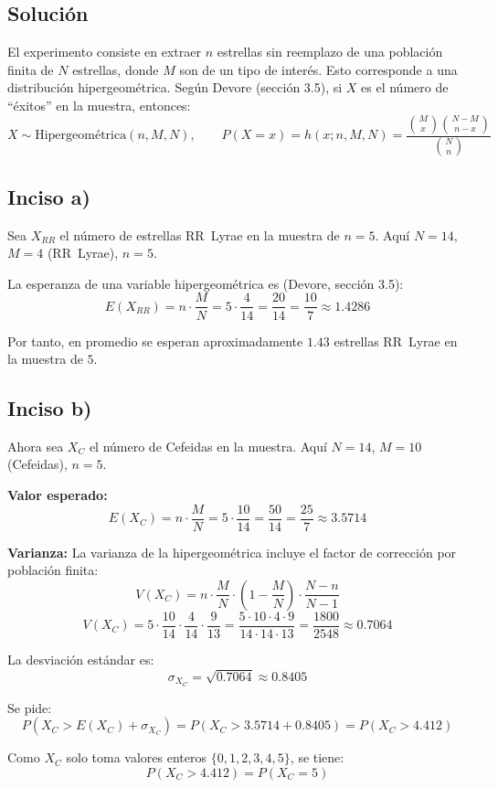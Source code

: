 \documentclass[12pt]{article}
\begin{document}
\subsection{Solución}

El experimento consiste en extraer $n$ estrellas sin reemplazo de una población finita de $N$ estrellas, donde $M$ son de un tipo de interés. Esto corresponde a una distribución hipergeométrica. Según Devore (sección 3.5), si $X$ es el número de ``éxitos'' en la muestra, entonces:
$$X \sim \text{Hipergeométrica}(n, M, N), \qquad P(X=x)=h(x;n,M,N)=\frac{\binom{M}{x}\binom{N-M}{n-x}}{\binom{N}{n}}$$

\subsection*{Inciso a)}

Sea $X_{RR}$ el número de estrellas RR~Lyrae en la muestra de $n=5$. Aquí $N=14$, $M=4$ (RR~Lyrae), $n=5$.

La esperanza de una variable hipergeométrica es (Devore, sección 3.5):
$$E(X_{RR})=n\cdot\frac{M}{N}=5\cdot\frac{4}{14}=\frac{20}{14}=\frac{10}{7}\approx 1.4286$$

Por tanto, en promedio se esperan aproximadamente $1.43$ estrellas RR~Lyrae en la muestra de $5$.

\subsection*{Inciso b)}

Ahora sea $X_{C}$ el número de Cefeidas en la muestra. Aquí $N=14$, $M=10$ (Cefeidas), $n=5$.

\textbf{Valor esperado:}
$$E(X_C)=n\cdot\frac{M}{N}=5\cdot\frac{10}{14}=\frac{50}{14}=\frac{25}{7}\approx 3.5714$$

\textbf{Varianza:} La varianza de la hipergeométrica incluye el factor de corrección por población finita:
$$V(X_C)=n\cdot\frac{M}{N}\cdot\left(1-\frac{M}{N}\right)\cdot\frac{N-n}{N-1}$$
$$V(X_C)=5\cdot\frac{10}{14}\cdot\frac{4}{14}\cdot\frac{9}{13}=\frac{5\cdot 10\cdot 4\cdot 9}{14\cdot 14\cdot 13}=\frac{1800}{2548}\approx 0.7064$$

La desviación estándar es:
$$\sigma_{X_C}=\sqrt{0.7064}\approx 0.8405$$

Se pide:
$$P\!\left(X_C > E(X_C)+\sigma_{X_C}\right)=P(X_C > 3.5714+0.8405)=P(X_C>4.412)$$

Como $X_C$ solo toma valores enteros $\{0,1,2,3,4,5\}$, se tiene:
$$P(X_C>4.412)=P(X_C=5)$$
\end{document}
